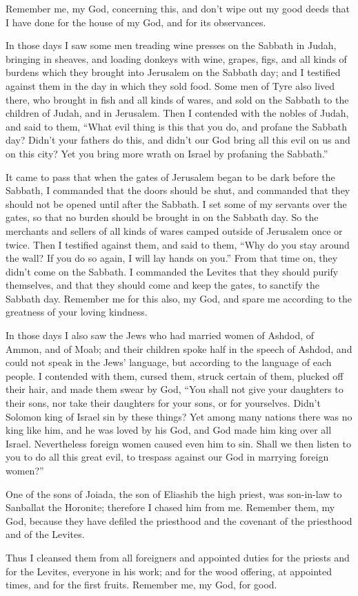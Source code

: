  Remember me, my God, concerning this, and don't wipe out
my good deeds that I have done for the house of my God, and for its
observances.

 In those days I saw some men treading wine presses on the
Sabbath in Judah, bringing in sheaves, and loading donkeys with wine,
grapes, figs, and all kinds of burdens which they brought into Jerusalem
on the Sabbath day; and I testified against them in the day in which
they sold food.  Some men of Tyre also lived there, who
brought in fish and all kinds of wares, and sold on the Sabbath to the
children of Judah, and in Jerusalem.  Then I contended with
the nobles of Judah, and said to them, ``What evil thing is this that
you do, and profane the Sabbath day?  Didn't your fathers
do this, and didn't our God bring all this evil on us and on this city?
Yet you bring more wrath on Israel by profaning the Sabbath.''

 It came to pass that when the gates of Jerusalem began to
be dark before the Sabbath, I commanded that the doors should be shut,
and commanded that they should not be opened until after the Sabbath. I
set some of my servants over the gates, so that no burden should be
brought in on the Sabbath day.  So the merchants and
sellers of all kinds of wares camped outside of Jerusalem once or twice.
 Then I testified against them, and said to them, ``Why do
you stay around the wall? If you do so again, I will lay hands on you.''
From that time on, they didn't come on the Sabbath.  I
commanded the Levites that they should purify themselves, and that they
should come and keep the gates, to sanctify the Sabbath day. Remember me
for this also, my God, and spare me according to the greatness of your
loving kindness.

 In those days I also saw the Jews who had married women of
Ashdod, of Ammon, and of Moab;  and their children spoke
half in the speech of Ashdod, and could not speak in the Jews' language,
but according to the language of each people.  I contended
with them, cursed them, struck certain of them, plucked off their hair,
and made them swear by God, ``You shall not give your daughters to their
sons, nor take their daughters for your sons, or for yourselves.
 Didn't Solomon king of Israel sin by these things? Yet
among many nations there was no king like him, and he was loved by his
God, and God made him king over all Israel. Nevertheless foreign women
caused even him to sin.  Shall we then listen to you to do
all this great evil, to trespass against our God in marrying foreign
women?''

 One of the sons of Joiada, the son of Eliashib the high
priest, was son-in-law to Sanballat the Horonite; therefore I chased him
from me.  Remember them, my God, because they have defiled
the priesthood and the covenant of the priesthood and of the Levites.

 Thus I cleansed them from all foreigners and appointed
duties for the priests and for the Levites, everyone in his work;
 and for the wood offering, at appointed times, and for the
first fruits. Remember me, my God, for good.
